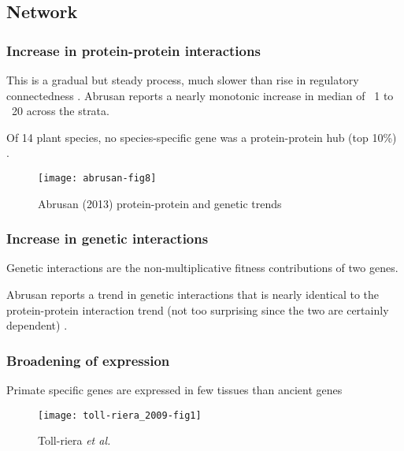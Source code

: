 \subsection{Network} \subsubsection{Increase in protein-protein
interactions}

        This is a gradual but steady process, much slower than rise in
        regulatory connectedness \cite{abrusan_integration_2013}. Abrusan
        reports a nearly monotonic increase in median of ~1 to ~20 across
        the strata.

        Of 14 plant species, no species-specific gene was a protein-protein
        hub (top 10\%) \cite{ye_evolutionary_2013}.


        \begin{figure}[!hbpt] \centering
            \texttt{[image: abrusan-fig8]} \caption{Abrusan
            (2013) protein-protein and genetic trends} \end{figure}

    \subsubsection{Increase in genetic interactions}

        Genetic interactions are the non-multiplicative fitness
        contributions of two genes.

        Abrusan reports a trend in genetic interactions that is nearly
        identical to the protein-protein interaction trend (not too
        surprising since the two are certainly dependent)
        \cite{abrusan_integration_2013}.

    \subsubsection{Broadening of expression}

        Primate specific genes are expressed in few tissues than ancient
        genes \cite{toll-riera_origin_2009}

        \begin{figure}[!hbpt] \centering
            \texttt{[image: toll-riera\_2009-fig1]}
            \caption{Toll-riera \textit{et al.}} \end{figure} \FloatBarrier
